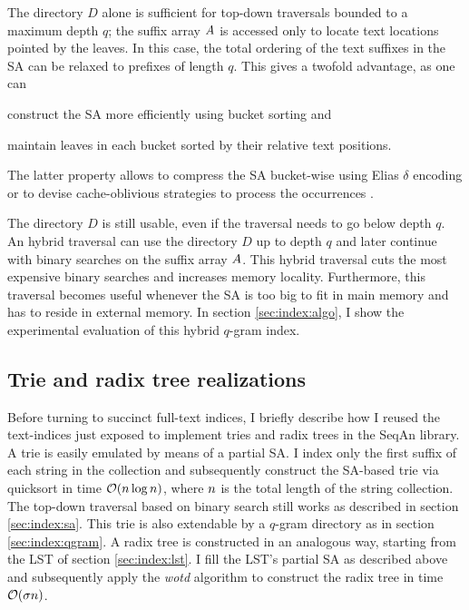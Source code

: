 The directory $D$ alone is sufficient for top-down traversals bounded to a maximum depth $q$;
the suffix array $A$ is accessed only to locate text locations pointed by the leaves.
In this case, the total ordering of the text suffixes in the SA can be relaxed to prefixes of length $q$.
This gives a twofold advantage, as one can
\begin{inparaenum}[(i)]
\item construct the SA more efficiently using bucket sorting and
\item maintain leaves in each bucket sorted by their relative text positions.
\end{inparaenum}
The latter property allows to compress the SA bucket-wise \eg using Elias $\delta$ encoding \citep{Elias1975} or to devise cache-oblivious strategies to process the occurrences \citep{Hach2010}.

The directory $D$ is still usable, even if the traversal needs to go below depth $q$.
An hybrid traversal can use the directory $D$ up to depth $q$ and later continue with binary searches on the suffix array $A$.
This hybrid traversal cuts the most expensive binary searches and increases memory locality.
Furthermore, this traversal becomes useful whenever the SA is too big to fit in main memory and has to reside in external memory.
In section \ref{sec:index:algo}, I show the experimental evaluation of this hybrid $q$-gram index.

\newpage

\subsection{Trie and radix tree realizations}
\label{sec:index:trie}

Before turning to succinct full-text indices, I briefly describe how I reused the text-indices just exposed to implement tries and radix trees in the SeqAn library.
A trie is easily emulated by means of a partial SA.
I index only the first suffix of each string in the collection and subsequently construct the SA-based trie via quicksort in time $\mathcal{O}(n \log{n})$, where $n$ is the total length of the string collection.
The top-down traversal based on binary search still works as described in section \ref{sec:index:sa}.
This trie is also extendable by a $q$-gram directory as in section \ref{sec:index:qgram}.
A radix tree is constructed in an analogous way, starting from the LST of section \ref{sec:index:lst}.
I fill the LST's partial SA as described above and subsequently apply the \emph{wotd} algorithm \citep{Giegerich1999} to construct the radix tree in time $\mathcal{O}(\sigma n)$.


